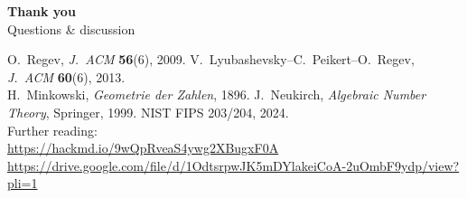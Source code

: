 \documentclass[aspectratio=169, 11pt]{beamer}
\begin{document}
\begin{frame}[plain]{}{}
  \vfill
  \begin{center}
    {\Large\bfseries\color{accent} Thank you}\\[6pt]
    {\small\color{gray} Questions \& discussion}
  \end{center}
  \vfill
  \begin{center}\scriptsize\color{gray}
    O.\ Regev, \textit{J.\ ACM} \textbf{56}(6), 2009.\quad
    V.\ Lyubashevsky--C.\ Peikert--O.\ Regev, \textit{J.\ ACM} \textbf{60}(6), 2013.\\
    H.\ Minkowski, \textit{Geometrie der Zahlen}, 1896.\quad
    J.\ Neukirch, \textit{Algebraic Number Theory}, Springer, 1999.\quad
    NIST FIPS 203/204, 2024.\\[4pt]
    Further reading:\\
    \url{https://hackmd.io/9wQpRveaS4ywg2XBugxF0A}\\
    \url{https://drive.google.com/file/d/1OdtsrpwJK5mDYlakeiCoA-2uOmbF9ydp/view?pli=1}
  \end{center}
\end{frame}
\end{document}
